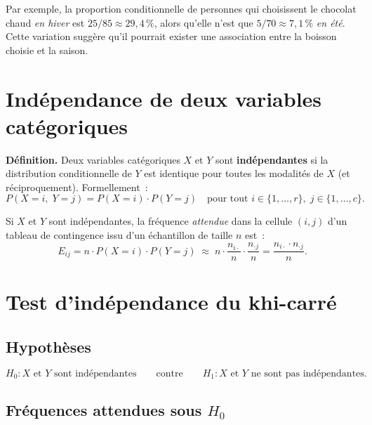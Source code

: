 \documentclass[11pt,french]{article}
\begin{document}
Par exemple, la proportion conditionnelle de personnes qui choisissent le chocolat chaud
\emph{en hiver} est $25/85 \approx 29{,}4\,\%$, alors qu'elle n'est que $5/70 \approx 7{,}1\,\%$
\emph{en été}. Cette variation suggère qu'il pourrait exister une association entre la boisson
choisie et la saison.

\section{Indépendance de deux variables catégoriques}

\textbf{Définition.} Deux variables catégoriques $X$ et $Y$ sont \textbf{indépendantes} si la
distribution conditionnelle de $Y$ est identique pour toutes les modalités de $X$
(et réciproquement). Formellement~:
\[
  P(X = i,\; Y = j) = P(X = i)\cdot P(Y = j)
  \quad \text{pour tout } i \in \{1,\ldots,r\},\; j \in \{1,\ldots,c\}.
\]

Si $X$ et $Y$ sont indépendantes, la fréquence \emph{attendue} dans la cellule $(i,j)$ d'un
tableau de contingence issu d'un échantillon de taille $n$ est~:
\[
  E_{ij}
  = n \cdot P(X = i) \cdot P(Y = j)
  \;\approx\; n \cdot \frac{n_{i\cdot}}{n} \cdot \frac{n_{\cdot j}}{n}
  = \frac{n_{i\cdot} \cdot n_{\cdot j}}{n}.
\]

\section{Test d'indépendance du khi-carré}

\subsection{Hypothèses}

\[
  H_0 : X \text{ et } Y \text{ sont indépendantes}
  \qquad\text{contre}\qquad
  H_1 : X \text{ et } Y \text{ ne sont pas indépendantes.}
\]

\subsection{Fréquences attendues sous $H_0$}
\end{document}
